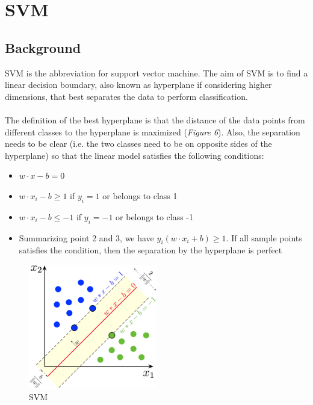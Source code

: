 \documentclass[12pt]{article}
\begin{document}
\section{SVM}

\subsection{Background}
SVM is the abbreviation for support vector machine. The aim of SVM is to find a linear decision boundary, also known as hyperplane if considering higher dimensions, that best separates the data to perform classification.\\
\\
The definition of the best hyperplane is that the distance of the data points from different classes to the hyperplane is maximized (\textit{Figure 6}). Also, the separation needs to be clear (i.e. the two classes need to be on opposite sides of the hyperplane) so that the linear model satisfies the following conditions:
\begin{itemize}
	\item $w\cdot x - b = 0$
	\item $w\cdot x_i - b \geq 1$ if $y_i = 1$ or belongs to class 1
	\item $w\cdot x_i - b \leq -1$ if $y_i = -1$ or belongs to class -1
	\item Summarizing point 2 and 3, we have $y_i(w\cdot x_i + b) \geq 1$. If all sample points satisfies the condition, then the separation by the hyperplane is perfect
\end{itemize}

\begin{figure}[htbp]
\begin{center}
\includegraphics[width = 0.5\textwidth]{Images/SVM.jpeg}
\caption{SVM}
\label{default}
\end{center}
\end{figure}
\end{document}
